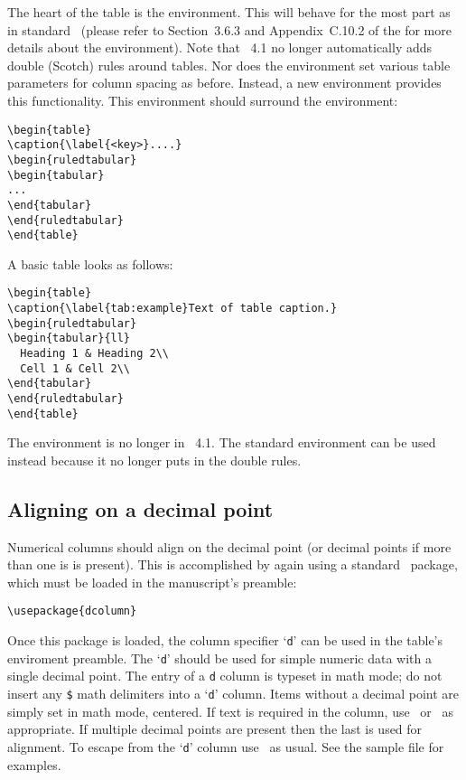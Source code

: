 \documentclass[%
,aps%
 ,twocolumn%
 ,secnumarabic%
,amssymb, amsmath,nobibnotes, aps, prl, floatfix]{revtex4-1}
\begin{document}
The heart of the table is the
 environment. This will behave for the most part as in
standard \LaTeXe\ (please refer to Section~3.6.3 and Appendix~C.10.2 of the
\LUG{} for more details about the  environment).
Note that \revtex~4.1 no longer automatically adds double (Scotch) rules
around tables. Nor does the  environment set various
table parameters for column spacing as before. Instead, a new
environment  provides this functionality. This
environment should surround the  environment:
\begin{verbatim}
\begin{table}
\caption{\label{<key>}....}
\begin{ruledtabular}
\begin{tabular}
...
\end{tabular}
\end{ruledtabular}
\end{table}
\end{verbatim}

A basic table looks as follows:
\begin{verbatim}
\begin{table}
\caption{\label{tab:example}Text of table caption.}
\begin{ruledtabular}
\begin{tabular}{ll}
  Heading 1 & Heading 2\\
  Cell 1 & Cell 2\\
\end{tabular}
\end{ruledtabular}
\end{table}
\end{verbatim}

The  environment is no longer in \revtex~4.1. The
standard  environment can be used instead because it
no longer puts in the double rules.

\subsection{Aligning on a decimal point}
Numerical columns should align on the decimal point (or
decimal points if more than one is is present). This is accomplished
by again using a standard \LaTeXe\ package,  which
must be loaded in the manuscript's preamble:
\begin{verbatim}
\usepackage{dcolumn}
\end{verbatim}
Once this package is loaded, the column specifier `\texttt{d}' can be
used in the table's  enviroment preamble.
The `\texttt{d}' should be used for simple numeric data with a single
decimal point.
%
The entry of a \texttt{d} column is typeset in math mode; do not
insert any \verb+$+ math delimiters into a `\texttt{d}' column.  Items
without a decimal point are simply set in math mode, centered.  If
text is required in the column, use \cmd\text\ or \cmd\mbox\ as
appropriate.  If multiple decimal points are present then the last is
used for alignment. To escape from the `\texttt{d}' column use
\cmd\multicolumn\ as usual. See the sample file  for examples.
\end{document}
